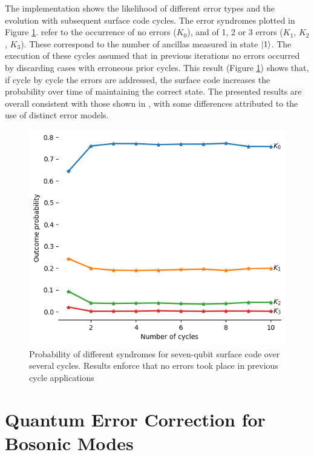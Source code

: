 The implementation shows the likelihood of different error types and the evolution with subsequent surface code cycles. The error syndromes plotted in Figure \ref{fig:syndrome_evol_sc}. refer to the occurrence of no errors ($K_0$), and of 1, 2 or 3 errors ($K_1$, $K_2$, $K_3$). These correspond to the number of ancillas measured in state $\ket{1}$. The execution of these cycles assumed that in previous iterations no errors occurred by discarding cases with erroneous prior cycles. This result (Figure \ref{fig:syndrome_evol_sc}) shows that, if cycle by cycle the errors are addressed, the surface code increases the probability over time of maintaining the correct state. The presented results are overall consistent with those shown in \cite{Andersen2020}, with some differences attributed to the use of distinct error models.
\begin{figure}
    \centering
    \includegraphics[scale=0.5]{syndrome_cycle.png}
    \caption[Probability of different syndromes for seven-qubit surface code over several cycles]{Probability of different syndromes for seven-qubit surface code over several cycles. Results enforce that no errors took place in previous cycle applications}
    \label{fig:syndrome_evol_sc}
\end{figure}


\section{Quantum Error Correction for Bosonic Modes}

